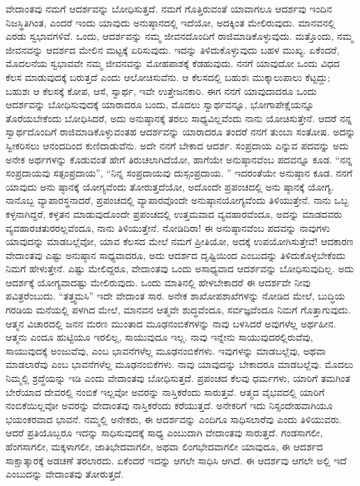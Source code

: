 ವೇದಾಂತವು ನಮಗೆ ಆದರ್ಶವನ್ನು ಬೋಧಿಸುತ್ತದೆ. ನಮಗೆ ಗೊತ್ತಿರುವಂತೆ ಯಾವಾಗಲೂ ಆದರ್ಶವು ಇಂದಿನ ನಿಜಸ್ಥಿತಿಗಿಂತ, ಎಂದರೆ ಇಂದು ಯಾವುದು ಅನುಷ್ಠಾನದಲ್ಲಿ ಇದೆಯೋ, ಅದಕ್ಕಿಂತ ಮೇಲಿರುವುದು. ಮಾನವನಲ್ಲಿ ಎರಡು ಸ್ವಭಾವಗಳಿವೆ. ಒಂದು, ಆದರ್ಶವನ್ನು ನಮ್ಮ ಜೀವನದೊಂದಿಗೆ ರಾಜಿಮಾಡಿಕೊಳ್ಳುವುದು. ಮತ್ತೊಂದು, ನಮ್ಮ ಜೀವನವನ್ನು ಆದರ್ಶದ ಮೇಲಿನ ಮಟ್ಟಕ್ಕೆ ಏರಿಸುವುದು. ಇದನ್ನು ತಿಳಿದುಕೊಳ್ಳುವುದು ಬಹಳ ಮುಖ್ಯ. ಏಕೆಂದರೆ, ಮೊದಲನೆಯ ಸ್ವಭಾವವೇ ನಮ್ಮ ಜೀವನವನ್ನು ಮೋಹಪಾಶಕ್ಕೆ ಕೆಡಹುವುದು. ನನಗೆ ಯಾವುದೋ ಒಂದು ವಿಧದ ಕೆಲಸ ಮಾಡುವುದಕ್ಕೆ ಬರುತ್ತದೆ ಎಂದು ಆಲೋಚಿಸುವೆನು. ಆ ಕೆಲಸದಲ್ಲಿ ಬಹುಶಃ ಮುಕ್ಕಾಲುಪಾಲು ಕೆಟ್ಟದ್ದು; ಬಹುಶಃ ಆ ಕೆಲಸಕ್ಕೆ ಕೋಪ, ಆಸೆ, ಸ್ವಾರ್ಥ, ಇವೇ ಉತ್ತೇಜನಕಾರಿ. ಈಗ ನನಗೆ ಯಾವುದಾದರೂ ಒಂದು ಆದರ್ಶವನ್ನು ಬೋಧಿಸುವುದಕ್ಕೆ ಯಾರಾದರೂ ಬಂದು, ಮೊದಲು ಸ್ವಾರ್ಥವನ್ನೂ, ಭೋಗಾಪೇಕ್ಷೆಯನ್ನೂ ತೊರೆಯಬೇಕೆಂದು ಬೋಧಿಸಿದರೆ, ಅದು ಅನುಷ್ಠಾನಕ್ಕೆ ತರಲು ಸಾಧ್ಯವಿಲ್ಲವೆಂದು ನಾನು ಯೋಚಿಸುತ್ತೇನೆ. ಆದರೆ ನನ್ನ ಸ್ವಾರ್ಥದೊಂದಿಗೆ ರಾಜಿಮಾಡಿಕೊಳ್ಳುವಂತಹ ಆದರ್ಶವನ್ನು ಯಾರಾದರೂ ತಂದರೆ ನನಗೆ ತುಂಬಾ ಸಂತೋಷ. ಅದನ್ನು ಸ್ವೀಕರಿಸಲು ಆನಂದದಿಂದ ಕುಣಿದಾಡುವೆನು. ಅದೇ ನನಗೆ ಬೇಕಾದ ಆದರ್ಶ. ಸಂಪ್ರದಾಯ ಎನ್ನುವ ಪದವನ್ನು ಅದು ಅನೇಕ ಅರ್ಥಗಳನ್ನು ಕೊಡುವಂತೆ ಹೇಗೆ ತಿರುಚಲಾಗಿದೆಯೋ, ಹಾಗೆಯೇ ಅನುಷ್ಠಾನವೆಂಬ ಪದವನ್ನೂ ಕೂಡ. “ನನ್ನ ಸಂಪ್ರದಾಯವು ಸತ್ಸಂಪ್ರದಾಯ”, “ನಿನ್ನ ಸಂಪ್ರದಾಯವು ದುಸ್ಸಂಪ್ರದಾಯ. ” ಇದರಂತೆಯೇ ಅನುಷ್ಠಾನ ಕೂಡ. ನನಗೆ ಯಾವುದು ಅನು ಷ್ಠಾನಕ್ಕೆ ಯೋಗ್ಯವೆಂದು ತೋರುತ್ತದೆಯೋ, ಅದೊಂದೇ ಪ್ರಪಂಚದಲ್ಲಿ ಅನು ಷ್ಠಾನಕ್ಕೆ ಯೋಗ್ಯ. ನಾನೊಬ್ಬ ವ್ಯಾಪಾರಸ್ಥನಾದರೆ, ಪ್ರಪಂಚದಲ್ಲಿ ವ್ಯಾಪಾರವೊಂದೇ ಅನುಷ್ಠಾನಯೋಗ್ಯವೆಂದು ತಿಳಿಯುತ್ತೇನೆ. ನಾನು ಒಬ್ಬ ಕಳ್ಳನಾಗಿದ್ದರೆ, ಕಳ್ಳತನ ಮಾಡುವುದೊಂದೇ ಪ್ರಪಂಚದಲ್ಲಿ ಉತ್ತಮವಾದ ವ್ಯವಹಾರವೆಂದೂ, ಅದನ್ನು ಮಾಡದವರು ವ್ಯವಹಾರಚತುರರಲ್ಲವೆಂದೂ, ನಾನು ತಿಳಿಯುತ್ತೇನೆ. ನೋಡಿದಿರಾ! ಈ ಅನುಷ್ಠಾನವೆಂಬ ಪದವನ್ನು ನಾವುಗಳು ಯಾವುದನ್ನು ಮಾಡಬಲ್ಲೆವೋ, ಯಾವ ಕೆಲಸದ ಮೇಲೆ ನಮಗೆ ಪ್ರೀತಿಯೋ, ಅದಕ್ಕೆ ಉಪಯೋಗಿಸುತ್ತೇವೆ! ಆದಕಾರಣ ವೇದಾಂತವು ಎಷ್ಟು ಅನುಷ್ಠಾನ ಸಾಧ್ಯವಾದರೂ, ಅದು ಆದರ್ಶದ ದೃಷ್ಟಿಯಿಂದ ಎಂಬುದನ್ನು ತಿಳಿದುಕೊಳ್ಳಬೇಕೆಂದು ನಿಮಗೆ ಹೇಳುತ್ತೇನೆ. ಎಷ್ಟು ಮೇಲಿದ್ದರೂ, ವೇದಾಂತವು ಒಂದು ಅಸಾಧ್ಯವಾದ ಆದರ್ಶವನ್ನು ಬೋಧಿಸುವುದಿಲ್ಲ. ಅದು ಆದರ್ಶಕ್ಕೆ ಯೋಗ್ಯವಾದಷ್ಟು ಮೇಲಿರುವುದು. ಒಂದು ಮಾತಿನಲ್ಲಿ ಹೇಳಬೇಕಾದರೆ ಈ ಆದರ್ಶವೇ ನೀವು ಪವಿತ್ರರೆಂಬುದು. “ತತ್ತ್ವಮಸಿ” ಇದೇ ವೇದಾಂತ ಸಾರ. ಅನೇಕ ಶಾಖೋಪಶಾಖೆಗಳನ್ನು ನೋಡಿದ ಮೇಲೆ, ಬುದ್ಧಿಯ ಗರಡಿಯ ಮನೆಯಲ್ಲಿ ಪಳಗಿದ ಮೇಲೆ, ಮಾನವನ ಆತ್ಮವೇ ಶುದ್ಧವೆಂದೂ, ಸರ್ವಜ್ಞವೆಂದೂ ನಿಮಗೆ ಗೊತ್ತಾಗುವುದು. ಆತ್ಮನ ವಿಚಾರದಲ್ಲಿ ಜನನ ಮರಣ ಮುಂತಾದ ಮೂಢನಂಬಿಕೆಗಳನ್ನು ನಾವು ಬಳಸಿದರೆ ಅವುಗಳೆಲ್ಲ ಅರ್ಥಹೀನ. ಆತ್ಮನು ಎಂದೂ ಹುಟ್ಟಿಯೂ ಇರಲಿಲ್ಲ, ಸಾಯುವುದೂ ಇಲ್ಲ. ನಾವು ಇನ್ನೇನು ಸಾಯುವುದರಲ್ಲಿರುವೆವು, ಸಾಯುವುದಕ್ಕೆ ಅಂಜುವೆವು, ಎಂಬ ಭಾವನೆಗಳೆಲ್ಲ ಮೂಢನಂಬಿಕೆಗಳು. ಇವುಗಳನ್ನು ಮಾಡಬಲ್ಲೆವು, ಅಥವಾ ಮಾಡಲಾರೆವು ಎಂಬ ಭಾವನೆಗಳೆಲ್ಲ ಮೂಢನಂಬಿಕೆಗಳು. ನಾವು ಯಾವುದನ್ನು ಬೇಕಾದರೂ ಮಾಡಬಲ್ಲೆವು. ಮೊದಲು ನಿಮ್ಮಲ್ಲಿ ಶ್ರದ್ಧೆಯನ್ನು ಇಡಿ ಎಂದು ವೇದಾಂತವು ಬೋಧಿಸುತ್ತದೆ. ಪ್ರಪಂಚದ ಕೆಲವು ಧರ್ಮಗಳು, ಯಾರಿಗೆ ತಮಗಿಂತ ಬೇರೆಯಾದ ದೇವರಲ್ಲಿ ನಂಬಿಕೆ ಇಲ್ಲವೋ ಅವರನ್ನು ನಾಸ್ತಿಕರೆಂದು ಸಾರುತ್ತವೆ. ಆತ್ಮದ ವೈಭವದಲ್ಲಿ ಯಾರಿಗೆ ನಂಬಿಕೆಯಿಲ್ಲವೋ ಅವರನ್ನು ವೇದಾಂತವು ನಾಸ್ತಿಕರೆಂದು ಕರೆಯುತ್ತದೆ. ಅನೇಕರಿಗೆ ಇದು ನಿಸ್ಸಂದೇಹವಾಗಿಯೂ ಭಯಂಕರವಾದ ಭಾವನೆ. ನಮ್ಮಲ್ಲಿ ಅನೇಕರು, ಈ ಆದರ್ಶವನ್ನು ಎಂದಿಗೂ ಸಾಧಿಸಲಾರೆವು ಎಂದು ತಿಳಿಯುವರು. ಆದರೆ ಪ್ರತಿಯೊಬ್ಬರೂ ಇದನ್ನು ಸಾಧಿಸುವುದಕ್ಕೆ ಸಾಧ್ಯ ಎಂಬುದಾಗಿ ವೇದಾಂತವು ಸಾರುತ್ತದೆ. ಗಂಡಸಾಗಲೀ, ಹೆಂಗಸಾಗಲೀ, ಮಕ್ಕಳಾಗಲೀ, ಜಾತಿಭೇದವಾಗಲೀ, ಅಥವಾ ಲಿಂಗಭೇದವಾಗಲೀ ಯಾವುದೂ, ಈ ಆದರ್ಶದ ಸಾಕ್ಷಾತ್ಕಾರಕ್ಕೆ ಅಡಚಣೆ ತರಲಾರದು. ಏಕೆಂದರೆ ಇದನ್ನು ಆಗಲೇ ಸಾಧಿಸಿ ಆಗಿದೆ. ಈ ಆದರ್ಶವು ಆಗಲೇ ಅಲ್ಲಿ ಇದೆ ಎಂಬುದನ್ನು ವೇದಾಂತವು ತೋರುತ್ತದೆ. 

